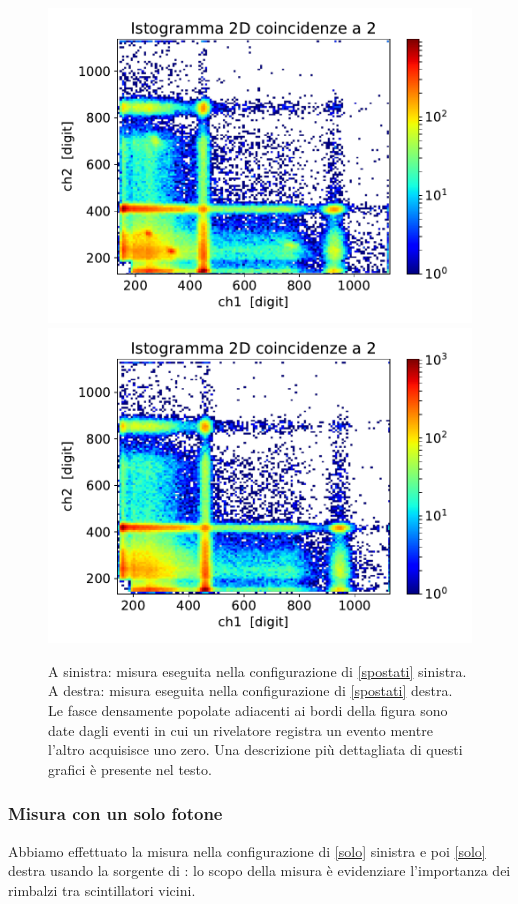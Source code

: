 \begin{figure}[h]
\centering
\hspace{-2.5 cm}
\subfloat
{
\includegraphics[width=21 em]{immagini/0518_rimbalzi}
}
\subfloat
{
\includegraphics[width=21 em]{immagini/0518_piombo}
}
\caption{A sinistra: misura eseguita nella configurazione di \autoref{spostati} sinistra. \\
A destra: misura eseguita nella configurazione di \autoref{spostati} destra.  \\
Le fasce densamente popolate adiacenti ai bordi della figura sono date dagli eventi in cui un rivelatore registra un evento mentre l'altro acquisisce uno zero.
Una descrizione più dettagliata di questi grafici è presente nel testo.}
\label{spostato}
\end{figure}

\subsubsection{Misura con un solo fotone}

Abbiamo effettuato la misura nella configurazione di \autoref{solo} sinistra e poi \autoref{solo} destra usando la sorgente di \cs{}: lo scopo della misura è evidenziare l'importanza dei rimbalzi tra scintillatori vicini.

